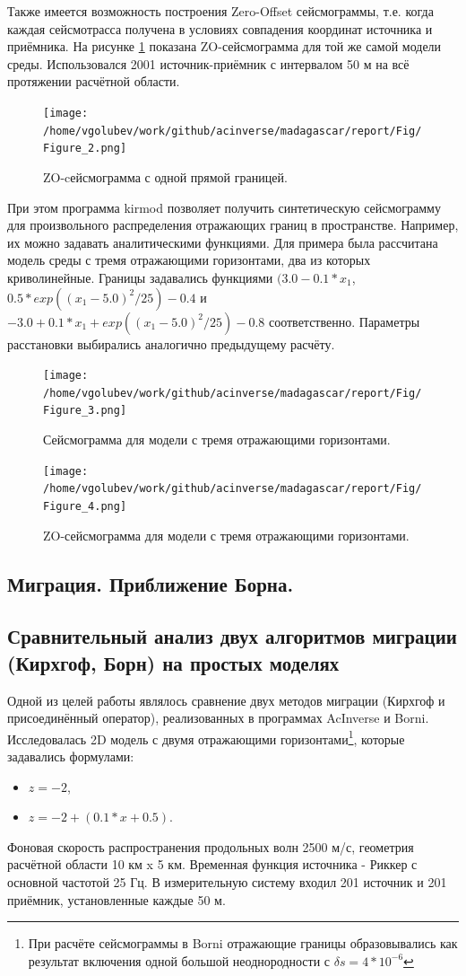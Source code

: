 \documentclass{article}
\begin{document}
Также имеется возможность построения Zero-Offset сейсмограммы, т.е. когда каждая сейсмотрасса получена в условиях совпадения координат источника и приёмника.
На рисунке \ref{seismo_2} показана ZO-сейсмограмма для той же самой модели среды.
Использовался 2001 источник-приёмник с интервалом 50 м на всё протяжении расчётной области.

\begin{figure}[ht]
  \center
  \texttt{[image: /home/vgolubev/work/github/acinverse/madagascar/report/Fig/Figure\_2.png]}
  \caption{ZO-cейсмограмма с одной прямой границей.}
\label{seismo_2}
\end{figure}

При этом программа kirmod позволяет получить синтетическую сейсмограмму для произвольного распределения отражающих границ в пространстве.
Например, их можно задавать аналитическими функциями.
Для примера была рассчитана модель среды с тремя отражающими горизонтами, два из которых криволинейные.
Границы задавались функциями $(3.0 - 0.1 * x_1$, $0.5 * exp((x_1 - 5.0)^2 / 25) - 0.4$ и $-3.0 + 0.1 * x_1 + exp((x_1 - 5.0)^2 / 25) - 0.8$ соответственно.
Параметры расстановки выбирались аналогично предыдущему расчёту.

\begin{figure}[ht]
  \center
  \texttt{[image: /home/vgolubev/work/github/acinverse/madagascar/report/Fig/Figure\_3.png]}
  \caption{Сейсмограмма для модели с тремя отражающими горизонтами.}
\label{seismo_3}
\end{figure}

\begin{figure}[ht]
  \center
  \texttt{[image: /home/vgolubev/work/github/acinverse/madagascar/report/Fig/Figure\_4.png]}
  \caption{ZO-сейсмограмма для модели с тремя отражающими горизонтами.}
\label{seismo_4}
\end{figure}

\subsection{Миграция. Приближение Борна.}

\subsection{Сравнительный анализ двух алгоритмов миграции (Кирхгоф, Борн) на простых моделях}

Одной из целей работы являлось сравнение двух методов миграции (Кирхгоф и присоединённый оператор), реализованных в программах AcInverse и Borni.
Исследовалась 2D модель с двумя отражающими горизонтами\footnote{При расчёте сейсмограммы в Borni отражающие границы образовывались как результат включения одной большой неоднородности с $\delta s = 4*10^{-6}$}, которые задавались формулами:
\begin{itemize}
\item $z=-2$,
\item $z=-2 + (0.1 * x + 0.5)$.
\end{itemize}
Фоновая скорость распространения продольных волн 2500 м/с, геометрия расчётной области 10 км x 5 км.
Временная функция источника - Риккер с основной частотой 25 Гц.
В измерительную систему входил 201 источник и 201 приёмник, установленные каждые 50 м.
\end{document}
